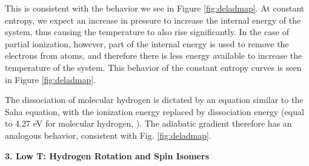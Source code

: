 \documentclass[apj]{emulateapj}
\newcommand{\delad}{\nabla_{\rm ad}}
\begin{document}
This is consistent with the behavior we see in Figure \ref{fig:deladmap}. At constant entropy, we expect an increase in pressure to increase the internal energy of the system, thus causing the temperature to also rise significantly. In the case of partial ionization, however, part of the internal energy is used to remove the electrons from atoms, and therefore there is less energy available to increase the temperature of the system. This behavior of the constant entropy curves is seen in Figure \ref{fig:deladmap}. 


The dissociation of molecular hydrogen is dictated by an equation similar to the Saha equation, with the ionization energy replaced by dissociation energy (equal to 4.27 eV for molecular hydrogen, \citealt{mandl89}). The adiabatic gradient therefore has an analogous behavior, consistent with Fig. \ref{fig:deladmap}.





\vspace{0.2in}

\textbf{3. Low T: Hydrogen Rotation and Spin Isomers}
\end{document}
